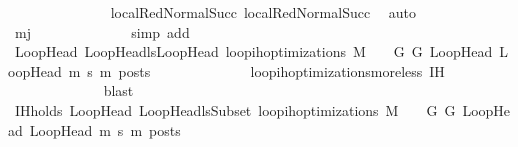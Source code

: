 \begin{isabellebody}
\ \ \ \ \ \ \ \ \ \ \ \ \isamarkupfalse%
\ {\isachardoublequoteopen}{}{\isachardoublequoteclose}{\isacharparenleft}{\kern0pt}{}{\isacharparenright}{\kern0pt}\ local{\isachardot}{\kern0pt}RedNormalSucc{\isacharparenleft}{\kern0pt}{}{\isacharparenright}{\kern0pt}\ local{\isachardot}{\kern0pt}RedNormalSucc{\isacharparenleft}{\kern0pt}{}{\isacharparenright}{\kern0pt}\ \isamarkupfalse%
\ auto\isanewline
\ \ \ \ \ \ \ \ \ \ \isamarkupfalse%
\ {\isachardoublequoteopen}m{\isasymle}j{\isachardoublequoteclose}\isanewline
\ \ \ \ \ \ \ \ \ \ \ \ \isamarkupfalse%
\ {\isacharparenleft}{\kern0pt}simp\ add{\isacharcolon}{\kern0pt}\ {\isachardoublequoteopen}{}{\isachardoublequoteclose}{\isacharparenleft}{\kern0pt}{}{\isacharparenright}{\kern0pt}{\isacharparenright}{\kern0pt}\isanewline
\ \ \ \ \ \ \ \ \ \ \isamarkupfalse%
\ \isamarkupfalse%
\ {\isachardoublequoteopen}{\isasymforall}{\isacharparenleft}{\kern0pt}LoopHead{\isacharcomma}{\kern0pt}\ LoopHead{\isacharprime}{\kern0pt}{\isacharparenright}{\kern0pt}{\isasymin}lsLoopHead{\isachardot}{\kern0pt}\ loop{\isacharunderscore}{\kern0pt}ih{\isacharunderscore}{\kern0pt}optimizations\ M\ {\isasymLambda}\ {\isasymGamma}\ {\isasymOmega}\ G\ G{\isacharprime}{\kern0pt}\ LoopHead\ LoopHead{\isacharprime}{\kern0pt}\ m{\isacharprime}{\kern0pt}\ s{\isacharprime}{\kern0pt}\ m\ posts{\isachardoublequoteclose}\isanewline
\ \ \ \ \ \ \ \ \ \ \ \ \isamarkupfalse%
\ loop{\isacharunderscore}{\kern0pt}ih{\isacharunderscore}{\kern0pt}optimizations{\isacharunderscore}{\kern0pt}more{\isacharunderscore}{\kern0pt}less\ IH\isanewline
\ \ \ \ \ \ \ \ \ \ \ \ \isamarkupfalse%
\ blast\isanewline
\ \ \ \ \ \ \ \ \ \ \isamarkupfalse%
\ \isamarkupfalse%
\ IH{\isacharunderscore}{\kern0pt}holds{\isacharcolon}{\kern0pt}\ {\isachardoublequoteopen}{\isasymforall}{\isacharparenleft}{\kern0pt}LoopHead{\isacharcomma}{\kern0pt}\ LoopHead{\isacharprime}{\kern0pt}{\isacharparenright}{\kern0pt}{\isasymin}lsSubset{\isachardot}{\kern0pt}\ loop{\isacharunderscore}{\kern0pt}ih{\isacharunderscore}{\kern0pt}optimizations\ M\ {\isasymLambda}\ {\isasymGamma}\ {\isasymOmega}\ G\ G{\isacharprime}{\kern0pt}\ LoopHead\ LoopHead{\isacharprime}{\kern0pt}\ m{\isacharprime}{\kern0pt}\ s{\isacharprime}{\kern0pt}\ m\ posts{\isachardoublequoteclose}\isanewline
\ \ \ \ \ \ \ \ \ \ \ \ \isamarkupfalse%

\end{isabellebody}

